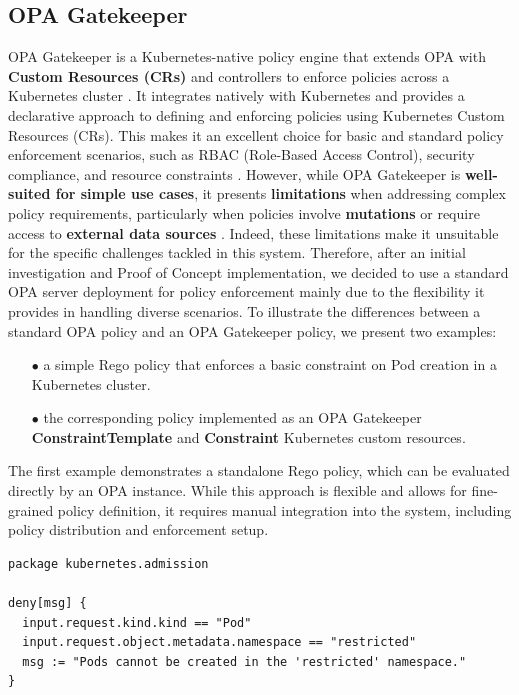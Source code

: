 \subsection{OPA Gatekeeper}

OPA Gatekeeper is a Kubernetes-native policy engine that extends OPA with \textbf{Custom Resources (CRs)} and controllers to enforce policies across a Kubernetes cluster \cite{opa_gatekeeper}. 
It integrates natively with Kubernetes and provides a declarative approach to defining and enforcing policies using Kubernetes Custom Resources (CRs). 
This makes it an excellent choice for basic and standard policy enforcement scenarios, such as RBAC (Role-Based Access Control), security compliance, and resource constraints \cite{opa_gatekeeper}.
However, while OPA Gatekeeper is \textbf{well-suited for simple use cases}, it presents \textbf{limitations} when addressing complex policy requirements, particularly when policies involve \textbf{mutations} or require access to \textbf{external data sources} \cite{opa_gatekeeper_external_data}. 
Indeed, these limitations make it unsuitable for the specific challenges tackled in this system. 
Therefore, after an initial investigation and Proof of Concept implementation, we decided to use a standard OPA server deployment for policy enforcement mainly due to the flexibility it provides in handling diverse scenarios.
To illustrate the differences between a standard OPA policy and an OPA Gatekeeper policy, we present two examples:  
\begin{itemize}[itemsep=0.2pt, topsep=1pt]
  \item[$\bullet$] a simple Rego policy that enforces a basic constraint on Pod creation in a Kubernetes cluster.
  \item[$\bullet$] the corresponding policy implemented as an OPA Gatekeeper \textbf{ConstraintTemplate} and \textbf{Constraint} Kubernetes custom resources.
\end{itemize}

The first example demonstrates a standalone Rego policy, which can be evaluated directly by an OPA instance. 
While this approach is flexible and allows for fine-grained policy definition, it requires manual integration into the system, including policy distribution and enforcement setup.  

\begin{lstlisting}[language=rego, caption={Simple OPA Rego Policy}, label={lst:opa-rego}]
package kubernetes.admission

deny[msg] {
  input.request.kind.kind == "Pod"
  input.request.object.metadata.namespace == "restricted"
  msg := "Pods cannot be created in the 'restricted' namespace."
}
\end{lstlisting}

